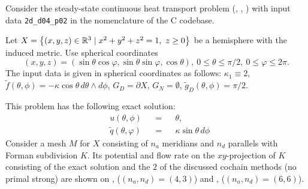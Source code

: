 \begin{example}
  \label{idec/diffusion/continuous/steady_state/examples/2d_d04_p02-example}
  Consider the steady-state continuous heat transport problem
  (,
   ,
   )
  with input data \verb|2d_d04_p02| in the nomenclature of the C codebase.

  Let $X = \left\{ (x, y, z) \in \mathbb{R}^3 \mid x^2 + y^2 + z^2 = 1,\ z \geq 0 \right\}$ be a
  hemisphere with the induced metric.
  Use spherical coordinates
  \begin{equation}
    (x, y, z)
    = (\sin \theta \cos \varphi, \sin \theta \sin \varphi, \cos \theta),\
    0 \leq \theta \leq \pi / 2,\
    0 \leq \varphi \leq 2 \pi.
  \end{equation}
  The input data is given in spherical coordinates as follows:
    $\kappa_1 \equiv 2$,
    $\tilde{f}(\theta, \phi) = - \kappa \cos \theta\, d \theta \wedge d \phi$,
    $G_D = \partial X$,
    $G_N = \emptyset$,
    $\tilde{g}_D(\theta, \phi) = \pi / 2$.

  This problem has the following exact solution:
  \begin{subequations}
    \begin{alignat}{3}
      & u(\theta, \phi) && = && \theta, \\
      & \tilde{q}(\theta, \varphi) && = && \kappa \sin \theta\, d \phi
    \end{alignat}
  \end{subequations}
  Consider a mesh $M$ for $X$ consisting of $n_a$ meridians and $n_d$ parallels
  with Forman subdivision $K$.
  Its potential and flow rate on the $xy$-projection of $K$ consisting of the
  exact solution and the $2$ of the discussed cochain methods (no primal strong)
  are shown on
  ,
  ($(n_a, n_d) = (4, 3)$)
  and
  ,
  ($(n_a, n_d) = (6, 6)$).
\end{example}
